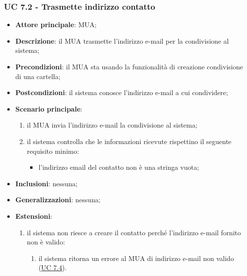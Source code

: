     \subsubsection{UC 7.2 - Trasmette indirizzo contatto} \label{sec:UC7.2}
    \begin{itemize}
        \item \textbf{Attore principale}: MUA;
        \item \textbf{Descrizione}: il MUA trasmette l'indirizzo e-mail per la condivisione al sistema;
        \item \textbf{Precondizioni}: il MUA sta usando la funzionalità di creazione condivisione di una cartella;
        \item \textbf{Postcondizioni}: il sistema conosce l'indirizzo e-mail a cui condividere;
        \item \textbf{Scenario principale}:
            \begin{enumerate}
                \item il MUA invia l'indirizzo e-mail la condivisione al sistema;
                \item il sistema controlla che le informazioni ricevute rispettino il seguente requisito minimo:
                    \begin{itemize}
                        \item l'indirizzo email del contatto non è una stringa vuota;
                    \end{itemize}
            \end{enumerate}
        \item \textbf{Inclusioni}: nessuna;
        \item \textbf{Generalizzazioni}: nessuna;
        \item \textbf{Estensioni}:
            \begin{enumerate}[label=\alph*.]
                \item il sistema non riesce a creare il contatto perché l'indirizzo e-mail fornito non è valido:
                \begin{enumerate}[label=\arabic*.]
                    \item il sistema ritorna un errore al MUA di indirizzo e-mail non valido (\hyperref[sec:UC7.4]{UC 7.4}).
                \end{enumerate}
            \end{enumerate}
    \end{itemize}


